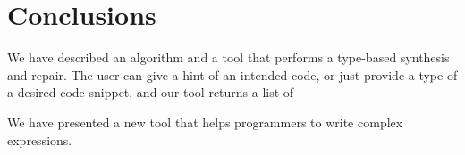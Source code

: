 \section{Conclusions}
\label{sec:conclusions}
We have described an algorithm and a tool that performs a type-based synthesis and repair.
The user can give a hint of an intended code, or just provide a type of a desired code snippet, and our tool returns a list of 



We have presented a new tool that helps programmers to write complex expressions. 
